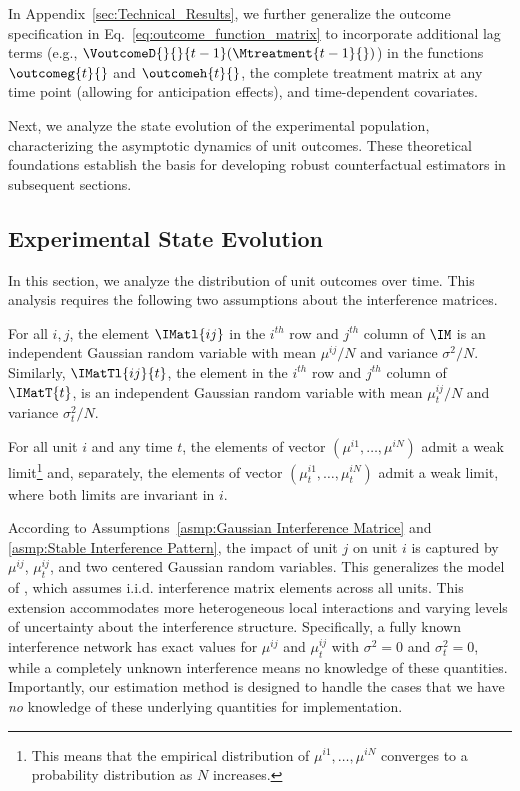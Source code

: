 %
\begin{remark}
In Appendix~\ref{sec:Technical_Results}, we further generalize the outcome specification in Eq.~\eqref{eq:outcome_function_matrix} to incorporate additional lag terms (e.g., $\VoutcomeD{}{}{t-1}(\Mtreatment{t-1}{})$) in the functions $\outcomeg{t}{}$ and $\outcomeh{t}{}$, the complete treatment matrix at any time point (allowing for anticipation effects), and time-dependent covariates.
\end{remark}
%

Next, we analyze the state evolution of the experimental population, characterizing the asymptotic dynamics of unit outcomes. These theoretical foundations establish the basis for developing robust counterfactual estimators in subsequent sections.


\subsection{Experimental State Evolution}
\label{sec:ESE}
% 
In this section, we analyze the distribution of unit outcomes over time. This analysis requires the following two assumptions about the interference matrices.
%
\begin{assumption}
    \label{asmp:Gaussian Interference Matrice}
    For all $i,j$, the element $\IMatl{ij}$ in the $i^{th}$ row and $j^{th}$ column of $\IM$ is an independent Gaussian random variable with mean $\mu^{ij}/N$ and variance $\sigma^2/N$. Similarly, $\IMatTl{ij}{t}$, the element in the $i^{th}$ row and $j^{th}$ column of $\IMatT{t}$, is an independent Gaussian random variable with mean $\mu^{ij}_t/N$ and variance $\sigma^2_t/N$.
\end{assumption}
%
%
\begin{assumption}
    \label{asmp:Stable Interference Pattern}
    For all unit $i$ and any time $t$, the elements of vector $(\mu^{i1}, \ldots, \mu^{iN})$ admit a weak limit\footnote{This means that the empirical distribution of ${\mu^{i1}, \ldots, \mu^{iN}}$ converges to a probability distribution as $N$ increases.} and, separately, the elements of vector $(\mu^{i1}_t, \ldots, \mu^{iN}_t)$ admit a weak limit, where both limits are invariant in $i$.
\end{assumption}
%
According to Assumptions~\ref{asmp:Gaussian Interference Matrice} and \ref{asmp:Stable Interference Pattern}, the impact of unit $j$ on unit $i$ is captured by $\mu^{ij}$, $\mu^{ij}_t$, and two centered Gaussian random variables. This generalizes the model of \cite{shirani2024causal}, which assumes i.i.d. interference matrix elements across all units. This extension accommodates more heterogeneous local interactions and varying levels of uncertainty about the interference structure. Specifically, a fully known interference network has exact values for $\mu^{ij}$ and $\mu^{ij}_t$ with $\sigma^2 = 0$ and $\sigma^2_t = 0$, while a completely unknown interference means no knowledge of these quantities. Importantly, our estimation method is designed to handle the cases that we have \emph{no} knowledge of these underlying quantities for implementation.
